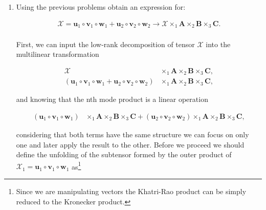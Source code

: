 \documentclass[a4paper,10pt]{article}
\begin{document}
\begin{enumerate}
\begin{enumerate}
            \item Using the previous problems obtain an expression for:
            
                \begin{align}
                    \mathcal{X} = \boldsymbol{u}_{1} \circ \boldsymbol{v}_{1} \circ \boldsymbol{w}_{1} + \boldsymbol{u}_{2} \circ \boldsymbol{v}_{2} \circ \boldsymbol{w}_{2} \rightarrow \mathcal{X} \times_{1} \boldsymbol{A} \times_{2} \boldsymbol{B} \times_{3} \boldsymbol{C}.
                \end{align}
            
                \paragraph{}First, we can input the low-rank decomposition of tensor $\mathcal{X}$ into the multilinear transformation
                
                \begin{align}
                    \mathcal{X} &\times_{1} \boldsymbol{A} \times_{2} \boldsymbol{B} \times_{3} \boldsymbol{C}, \\
                    \left( \boldsymbol{u}_{1} \circ \boldsymbol{v}_{1} \circ \boldsymbol{w}_{1} + \boldsymbol{u}_{2} \circ \boldsymbol{v}_{2} \circ \boldsymbol{w}_{2} \right) &\times_{1} \boldsymbol{A} \times_{2} \boldsymbol{B} \times_{3} \boldsymbol{C},
                \end{align}
                
                and knowing that the nth mode product is a linear operation
                
                \begin{align}
                    \left( \boldsymbol{u}_{1} \circ \boldsymbol{v}_{1} \circ \boldsymbol{w}_{1} \right) &\times_{1} \boldsymbol{A} \times_{2} \boldsymbol{B} \times_{3} \boldsymbol{C} + \left( \boldsymbol{u}_{2} \circ \boldsymbol{v}_{2} \circ \boldsymbol{w}_{2} \right) \times_{1} \boldsymbol{A} \times_{2} \boldsymbol{B} \times_{3} \boldsymbol{C},
                \end{align}
                
                considering that both terms have the same structure we can focus on only one and later apply the result to the other. Before we proceed we should define the unfolding of the subtensor formed by the outer product of $\mathcal{X}_{1} = \boldsymbol{u}_{1} \circ \boldsymbol{v}_{1} \circ \boldsymbol{w}_{1}$ as\footnote{Since we are manipulating vectors the Khatri-Rao product can be simply reduced to the Kronecker product.}
                

\end{enumerate}
\end{enumerate}
\end{document}
